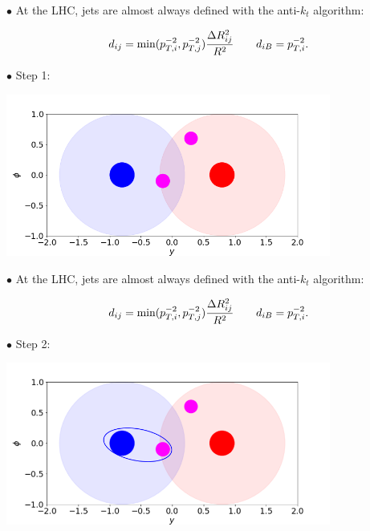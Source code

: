 \documentclass[9pt,a4paper,unknownkeysallowed,xcolor=dvipsnames,aspectratio=43]{beamer}
\begin{document}
%
%
\begin{frame}

{\color{darkred}\Large$\bullet$} {\color{darkred} At the LHC, jets are almost always defined with the anti-$k_t$ algorithm:}

  \begin{equation}
    d_{ij} = \text{min}(p_{T,i}^{-2},p_{T,j}^{-2})\frac{\Delta R_{ij}^2}{R^2}\qquad d_{iB} = p_{T,i}^{-2}.
  \notag\end{equation}
 \vspace{2mm}
  
{\color{darkred}\Large$\bullet$} Step 1:
\vspace{2mm}
\begin{center}
\includegraphics[width=0.8\textwidth]{antikt1.png}
\end{center}
\end{frame}
%
%
%
\begin{frame}

{\color{darkred}\Large$\bullet$} {\color{darkred} At the LHC, jets are almost always defined with the anti-$k_t$ algorithm:}

  \begin{equation}
    d_{ij} = \text{min}(p_{T,i}^{-2},p_{T,j}^{-2})\frac{\Delta R_{ij}^2}{R^2}\qquad d_{iB} = p_{T,i}^{-2}.
  \notag\end{equation}
 \vspace{2mm}
  
{\color{darkred}\Large$\bullet$} Step 2:
\vspace{2mm}
\begin{center}
\includegraphics[width=0.8\textwidth]{antikt12.png}
\end{center}
\end{frame}
\end{document}
